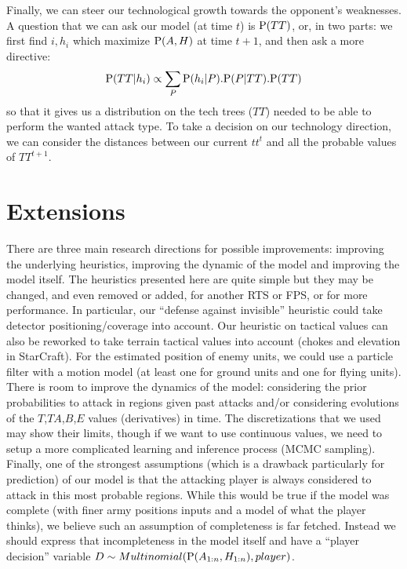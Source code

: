 Finally, we can steer our technological growth towards the opponent's weaknesses. A question that we can ask our model (at time $t$) is $\mathrm{P}(TT)$, or, in two parts: we first find $i,h_i$ which maximize $\mathrm{P}(A,H)$ at time $t+1$, and then ask a more directive:
$$\mathrm{P}(TT|h_i) \propto \sum_{P} \mathrm{P}(h_i|P).\mathrm{P}(P|TT).\mathrm{P}(TT)$$
so that it gives us a distribution on the tech trees ($TT$) needed to be able to perform the wanted attack type. To take a decision on our technology direction, we can consider the distances between our current $tt^t$ and all the probable values of $TT^{t+1}$.

\section{Extensions}
There are three main research directions for possible improvements: improving the underlying heuristics, improving the dynamic of the model and improving the model itself. The heuristics presented here are quite simple but they may be changed, and even removed or added, for another RTS or FPS, or for more performance. In particular, our ``defense against invisible'' heuristic could take detector positioning/coverage into account. Our heuristic on tactical values can also be reworked to take terrain tactical values into account (chokes and elevation in StarCraft). For the estimated position of enemy units, we could use a particle filter \cite{Weber2011aiide} with a motion model (at least one for ground units and one for flying units). There is room to improve the dynamics of the model: considering the prior probabilities to attack in regions given past attacks and/or considering evolutions of the $T$,$TA$,$B$,$E$ values (derivatives) in time. The discretizations that we used may show their limits, though if we want to use continuous values, we need to setup a more complicated learning and inference process (MCMC sampling). Finally, one of the strongest assumptions (which is a drawback particularly for prediction) of our model is that the attacking player is always considered to attack in this most probable regions. While this would be true if the model was complete (with finer army positions inputs and a model of what the player thinks), we believe such an assumption of completeness is far fetched. Instead we should express that incompleteness in the model itself and have a ``player decision'' variable $D \sim Multinomial(\mathrm{P}(A_{1:n},H_{1:n}),player)$.

